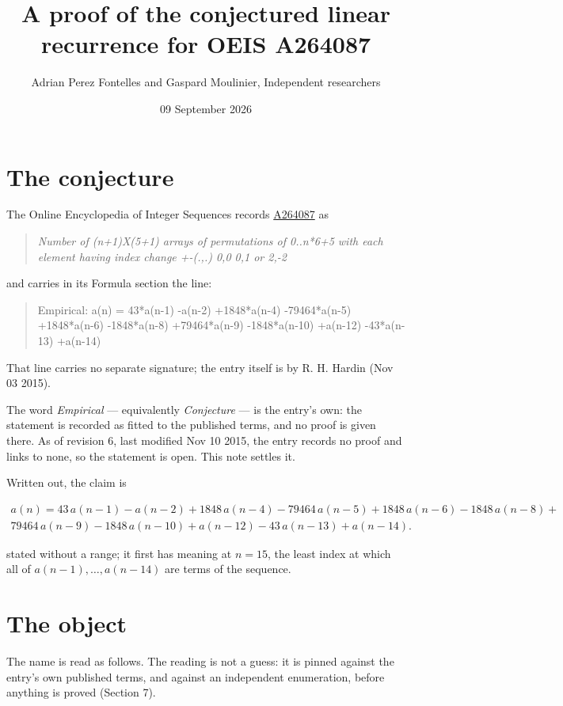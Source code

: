 \documentclass[11pt]{article}
\title{A proof of the conjectured linear recurrence for OEIS A264087}
\author{Adrian Perez Fontelles and Gaspard Moulinier, Independent researchers}
\date{09 September 2026}
\theoremstyle{definition}
\begin{document}
\maketitle
\section{The conjecture}

The Online Encyclopedia of Integer Sequences records \href{https://oeis.org/A264087}{A264087} as

\begin{quote}\itshape Number of (n+1)X(5+1) arrays of permutations of 0..n*6+5 with each element having index change +-(.,.) 0,0 0,1 or 2,-2\end{quote}

and carries in its Formula section the line:

\begin{quote}\ttfamily Empirical: a(n) = 43*a(n-1) -a(n-2) +1848*a(n-4) -79464*a(n-5) +1848*a(n-6) -1848*a(n-8) +79464*a(n-9) -1848*a(n-10) +a(n-12) -43*a(n-13) +a(n-14)\end{quote}

That line carries no separate signature; the entry itself is by R. H. Hardin (Nov 03 2015).

The word {\itshape Empirical} --- equivalently {\itshape Conjecture} --- is the entry's own: the statement is recorded as fitted to the published terms, and no proof is given there. As of revision 6, last modified Nov 10 2015, the entry records no proof and links to none, so the statement is open. This note settles it.

Written out, the claim is

\begin{multline*} a(n) = 43\,a(n-1) - a(n-2) + 1848\,a(n-4) - 79464\,a(n-5) + 1848\,a(n-6) - 1848\,a(n-8) + \\ 79464\,a(n-9) - 1848\,a(n-10) + a(n-12) - 43\,a(n-13) + a(n-14). \end{multline*}

stated without a range; it first has meaning at $n = 15$, the least index at which all of $a(n-1),\dots,a(n-14)$ are terms of the sequence.

\section{The object}

The name is read as follows. The reading is not a guess: it is pinned against the entry's own published terms, and against an independent enumeration, before anything is proved (Section 7).
\end{document}
